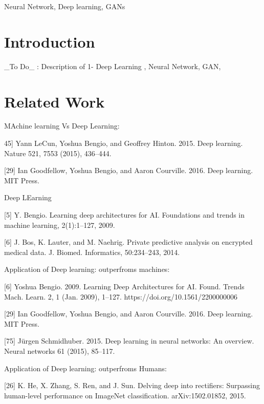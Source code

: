 \documentclass[conference]{IEEEtran}
\begin{document}
\begin{IEEEkeywords}
Neural Network, Deep learning, GANs
\end{IEEEkeywords}

\section{Introduction}
\_To Do\_ : Description of 1- Deep Learning , Neural Network, GAN,

\section{Related Work}

MAchine learning Vs Deep Learning:


45] Yann LeCun, Yoshua Bengio, and Geoffrey Hinton. 2015. Deep learning. Nature
521, 7553 (2015), 436–444.

[29] Ian Goodfellow, Yoshua Bengio, and Aaron Courville. 2016. Deep learning. MIT
Press.

Deep LEarning


[5] Y. Bengio. Learning deep architectures for AI. Foundations
and trends in machine learning, 2(1):1–127, 2009.

[6] J. Bos, K. Lauter, and M. Naehrig. Private predictive analysis
on encrypted medical data. J. Biomed. Informatics,
50:234–243, 2014.



Application of Deep learning: outperfroms machines:


[6] Yoshua Bengio. 2009. Learning Deep Architectures for AI. Found. Trends Mach.
Learn. 2, 1 (Jan. 2009), 1–127. https://doi.org/10.1561/2200000006


[29] Ian Goodfellow, Yoshua Bengio, and Aaron Courville. 2016. Deep learning. MIT
Press.

[75] Jürgen Schmidhuber. 2015. Deep learning in neural networks: An overview.
Neural networks 61 (2015), 85–117.


Application of Deep learning: outperfroms Humans:


[26] K. He, X. Zhang, S. Ren, and J. Sun. Delving deep into
rectifiers: Surpassing human-level performance on ImageNet
classification. arXiv:1502.01852, 2015.
\end{document}
